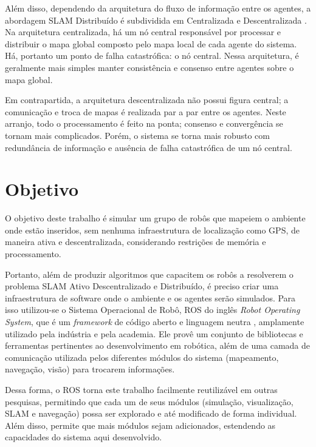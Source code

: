 Além disso, dependendo da arquitetura do fluxo de informação entre os agentes, 
a abordagem SLAM Distribuído é subdividida em Centralizada e Descentralizada \cite[p.~1316]{cadena2016past}. Na arquitetura centralizada, há um nó central 
responsável por processar e distribuir o mapa global composto 
pelo mapa local de cada agente do sistema. Há, portanto um ponto de falha 
catastrófica: o nó central. Nessa arquitetura, é geralmente mais simples manter consistência e consenso entre agentes sobre o mapa global. 

Em contrapartida, a arquitetura descentralizada não possui figura central; a 
comunicação e troca de mapas é realizada par a par entre os agentes. Neste arranjo, 
todo o processamento é feito na ponta; consenso e convergência se tornam mais 
complicados. Porém, o sistema se torna mais robusto com redundância de 
informação e ausência de falha catastrófica de um nó central.


\section{Objetivo}
O objetivo deste trabalho é simular um grupo de 
robôs que mapeiem o ambiente onde estão inseridos, sem nenhuma infraestrutura de localização como GPS, de maneira ativa e 
descentralizada, considerando restrições de memória e processamento.

Portanto, além de produzir algoritmos que capacitem os robôs a resolverem o 
problema SLAM Ativo Descentralizado e Distribuído, é preciso criar uma 
infraestrutura de software onde o ambiente e os agentes serão simulados. Para 
isso utilizou-se o Sistema Operacional de Robô, ROS do inglês \textit{Robot 
Operating System}, que é um \textit{framework} de código aberto e linguagem 
neutra \cite{quigley2009ros}, amplamente utilizado pela indústria e pela 
academia. Ele provê um conjunto de bibliotecas e ferramentas pertinentes 
ao desenvolvimento em robótica, além de uma camada de comunicação 
utilizada pelos diferentes módulos do sistema (mapeamento, navegação, 
visão) para trocarem informações.

Dessa forma, o ROS torna este trabalho facilmente reutilizável 
em outras pesquisas, permitindo que cada um de seus módulos 
(simulação, visualização, SLAM e navegação) possa ser explorado e até 
modificado de forma individual. Além disso, permite que mais módulos sejam 
adicionados, estendendo as capacidades do sistema aqui desenvolvido.

